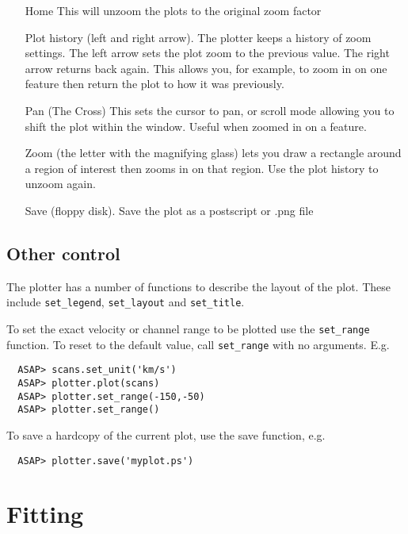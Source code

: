 \documentclass[11pt]{article}
\newcommand{\cmd}[1]{{\tt #1}}
\begin{document}
\begin{itemize}

\item[Home] This will unzoom the plots to the original zoom factor

\item[Plot history] (left and right arrow). The plotter keeps a
history of zoom settings. The left arrow sets the plot zoom to the
previous value. The right arrow returns back again. This allows you,
for example, to zoom in on one feature then return the plot to how it
was previously.

\item[Pan] (The Cross) This sets the cursor to pan, or scroll mode
       allowing you to shift the plot within the window. Useful when
       zoomed in on a feature.

\item[Zoom] (the letter with the magnifying glass) lets you draw a
       rectangle around a region of interest then zooms in on that
       region. Use the plot history to unzoom again.  

\item[Save] (floppy disk). Save the plot as a postscript or .png file

\end{itemize}

\subsection{Other control}

The plotter has a number of functions to describe the layout of the
plot. These include \cmd{set\_legend}, \cmd{set\_layout} and \cmd{set\_title}.

To set the exact velocity or channel range to be plotted use the
\cmd{set\_range} function. To reset to the default value, call
\cmd{set\_range} with no arguments. E.g.

\begin{verbatim}
  ASAP> scans.set_unit('km/s')
  ASAP> plotter.plot(scans)
  ASAP> plotter.set_range(-150,-50)
  ASAP> plotter.set_range()
\end{verbatim}

To save a hardcopy of the current plot, use the save function, e.g. 

\begin{verbatim}
  ASAP> plotter.save('myplot.ps')
\end{verbatim}

\section{Fitting}
\end{document}
